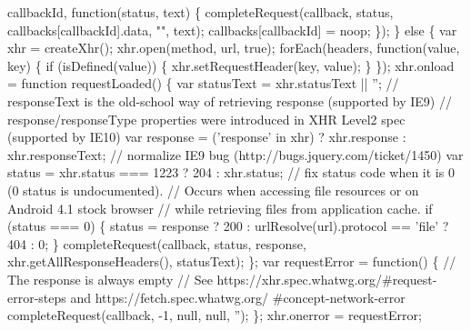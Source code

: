 \begin{DoxyCodeInclude}
{\textcolor{comment}{          callbackId, function(status, text) \{}
\textcolor{comment}{        completeRequest(callback, status, callbacks[callbackId].data, "", text);}
\textcolor{comment}{        callbacks[callbackId] = noop;}
\textcolor{comment}{      \});}
\textcolor{comment}{    \} else \{}
\textcolor{comment}{}
\textcolor{comment}{      var xhr = createXhr();}
\textcolor{comment}{}
\textcolor{comment}{      xhr.open(method, url, true);}
\textcolor{comment}{      forEach(headers, function(value, key) \{}
\textcolor{comment}{        if (isDefined(value)) \{}
\textcolor{comment}{            xhr.setRequestHeader(key, value);}
\textcolor{comment}{        \}}
\textcolor{comment}{      \});}
\textcolor{comment}{}
\textcolor{comment}{      xhr.onload = function requestLoaded() \{}
\textcolor{comment}{        var statusText = xhr.statusText || '';}
\textcolor{comment}{}
\textcolor{comment}{        // responseText is the old-school way of retrieving response (supported by IE9)}
\textcolor{comment}{        // response/responseType properties were introduced in XHR Level2 spec (supported by IE10)}
\textcolor{comment}{        var response = ('response' in xhr) ? xhr.response : xhr.responseText;}
\textcolor{comment}{}
\textcolor{comment}{        // normalize IE9 bug (http://bugs.jquery.com/ticket/1450)}
\textcolor{comment}{        var status = xhr.status === 1223 ? 204 : xhr.status;}
\textcolor{comment}{}
\textcolor{comment}{        // fix status code when it is 0 (0 status is undocumented).}
\textcolor{comment}{        // Occurs when accessing file resources or on Android 4.1 stock browser}
\textcolor{comment}{        // while retrieving files from application cache.}
\textcolor{comment}{        if (status === 0) \{}
\textcolor{comment}{          status = response ? 200 : urlResolve(url).protocol == 'file' ? 404 : 0;}
\textcolor{comment}{        \}}
\textcolor{comment}{}
\textcolor{comment}{        completeRequest(callback,}
\textcolor{comment}{            status,}
\textcolor{comment}{            response,}
\textcolor{comment}{            xhr.getAllResponseHeaders(),}
\textcolor{comment}{            statusText);}
\textcolor{comment}{      \};}
\textcolor{comment}{}
\textcolor{comment}{      var requestError = function() \{}
\textcolor{comment}{        // The response is always empty}
\textcolor{comment}{        // See https://xhr.spec.whatwg.org/#request-error-steps and https://fetch.spec.whatwg.org/
      #concept-network-error}
\textcolor{comment}{        completeRequest(callback, -1, null, null, '');}
\textcolor{comment}{      \};}
\textcolor{comment}{}
\textcolor{comment}{      xhr.onerror = requestError;}
}
\end{DoxyCodeInclude}
